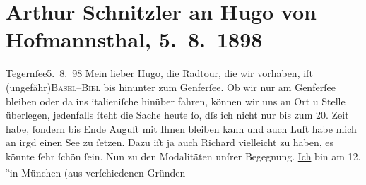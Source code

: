 

         
         \renewcommand{\erwaehntePersonen}{Personen: Richard Beer-Hofmann, Hugo von Hofmannsthal, Gustav Schwarzkopf}
         \renewcommand{\erwaehnteOrte}{Orte: Basel, Biel, Genfer See, Hinterbrühl, Innsbruck, Italien, München, Salzburg, Tegernsee, Wien}
         \renewcommand{\erwaehnteWerke}{Werke: Der Tod Georgs}
               \section[Arthur Schnitzler an Hugo von Hofmannsthal, 5. 8. 1898]{ Arthur Schnitzler an Hugo von Hofmannsthal, 5. 8. 1898}\nopagebreak{}\rehead{ }\begin{ledgroupsized}[t]{13cm}\normalsize\beginnumbering \toendnotes[C]{\smallbreak\pagebreak[2]} 
\toendnotes[C]{\smallbreak}\pstart
           \raggedleft{}{\pb}Tegernſee5. 8. 98\pend
           \pstart
           Mein lieber Hugo, die Radtour, die wir vorhaben, iſt \introOben{}(\introOben{}ungefähr\introOben{})\introOben{}{ }\textsc{Basel}–\textsc{Biel} bis hinunter zum Genferſee. Ob wir nur am
                        Genferſee bleiben oder da{\geminationn} ins italieniſche hinüber fahren, können wir uns an Ort u Stelle überlegen,
                    jedenfalls ſteht die Sache heute ſo, dſs ich nicht nur bis zum 20.
                    Zeit habe, ſondern bis Ende Auguſt mit Ihnen bleiben kann und auch
                    Luſt habe {\pb}mich an irgd einen See zu ſetzen. Dazu iſt
                    ja auch Richard vielleicht zu haben, es
                    könnte ſehr ſchön ſein.\pend
           \pstart
           Nun zu den Modalitäten unſrer Begegnung. \uline{Ich} bin
                    am 12.{ }\substVorne{}\textsuperscript{a}\substDazwischen{}i\substHinten{}n München (aus verſchiedenen Gründen

\end{ledgroupsized}
